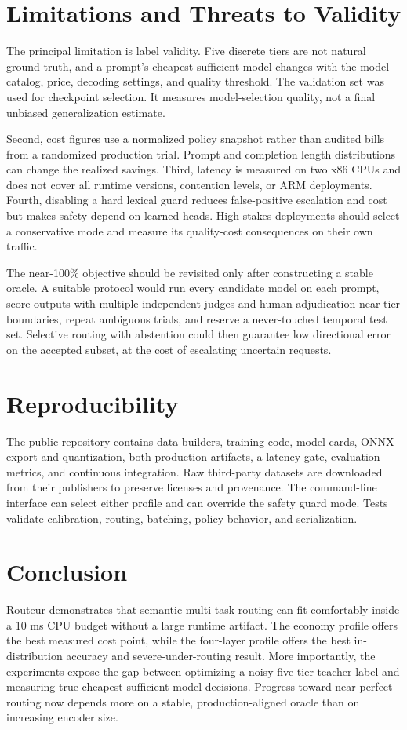 \documentclass[10pt,twocolumn]{article}
\begin{document}
\section{Limitations and Threats to Validity}
The principal limitation is label validity. Five discrete tiers are not natural
ground truth, and a prompt's cheapest sufficient model changes with the model
catalog, price, decoding settings, and quality threshold. The validation set was
used for checkpoint selection. It measures model-selection quality, not a final
unbiased generalization estimate.

Second, cost figures use a normalized policy snapshot rather than audited bills
from a randomized production trial. Prompt and completion length distributions
can change the realized savings. Third, latency is measured on two x86 CPUs and
does not cover all runtime versions, contention levels, or ARM deployments.
Fourth, disabling a hard lexical guard reduces false-positive escalation and cost
but makes safety depend on learned heads. High-stakes deployments should select a
conservative mode and measure its quality-cost consequences on their own traffic.

The near-100\% objective should be revisited only after constructing a stable
oracle. A suitable protocol would run every candidate model on each prompt,
score outputs with multiple independent judges and human adjudication near tier
boundaries, repeat ambiguous trials, and reserve a never-touched temporal test
set. Selective routing with abstention could then guarantee low directional error
on the accepted subset, at the cost of escalating uncertain requests.

\section{Reproducibility}
The public repository contains data builders, training code, model cards, ONNX
export and quantization, both production artifacts, a latency gate, evaluation
metrics, and continuous integration. Raw third-party datasets are downloaded from
their publishers to preserve licenses and provenance. The command-line interface
can select either profile and can override the safety guard mode. Tests validate
calibration, routing, batching, policy behavior, and serialization.

\section{Conclusion}
Routeur demonstrates that semantic multi-task routing can fit comfortably inside
a 10 ms CPU budget without a large runtime artifact. The economy profile offers
the best measured cost point, while the four-layer profile offers the best
in-distribution accuracy and severe-under-routing result. More importantly, the
experiments expose the gap between optimizing a noisy five-tier teacher label and
measuring true cheapest-sufficient-model decisions. Progress toward near-perfect
routing now depends more on a stable, production-aligned oracle than on increasing
encoder size.
\end{document}
